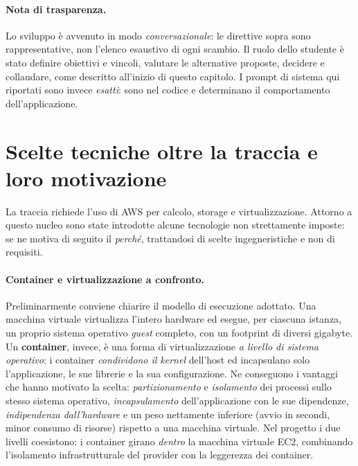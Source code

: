 \documentclass[11pt,a4paper]{article}
\begin{document}
\paragraph{Nota di trasparenza.} Lo sviluppo è avvenuto in modo \emph{conversazionale}:
le direttive sopra sono rappresentative, non l'elenco esaustivo di ogni scambio. Il ruolo
dello studente è stato definire obiettivi e vincoli, valutare le alternative proposte,
decidere e collaudare, come descritto all'inizio di questo capitolo. I prompt di sistema
qui riportati sono invece \emph{esatti}: sono nel codice e determinano il comportamento
dell'applicazione.

\section{Scelte tecniche oltre la traccia e loro motivazione}
\label{sec:extra}
La traccia richiede l'uso di AWS per calcolo, storage e virtualizzazione. Attorno a
questo nucleo sono state introdotte alcune tecnologie non strettamente imposte: se ne
motiva di seguito il \emph{perché}, trattandosi di scelte ingegneristiche e non di
requisiti.

\paragraph{Container e virtualizzazione a confronto.} Preliminarmente conviene
chiarire il modello di esecuzione adottato. Una macchina virtuale virtualizza l'intero
hardware ed esegue, per ciascuna istanza, un proprio sistema operativo \emph{guest}
completo, con un footprint di diversi gigabyte. Un \textbf{container}, invece, è una
forma di virtualizzazione \emph{a livello di sistema operativo}: i container
\emph{condividono il kernel} dell'host ed incapsulano solo l'applicazione, le sue
librerie e la sua configurazione. Ne conseguono i vantaggi che hanno motivato la scelta:
\emph{partizionamento} e \emph{isolamento} dei processi sullo stesso sistema operativo,
\emph{incapsulamento} dell'applicazione con le sue dipendenze, \emph{indipendenza
dall'hardware} e un peso nettamente inferiore (avvio in secondi, minor consumo di
risorse) rispetto a una macchina virtuale. Nel progetto i due livelli coesistono: i
container girano \emph{dentro} la macchina virtuale EC2, combinando l'isolamento
infrastrutturale del provider con la leggerezza dei container.
\end{document}

